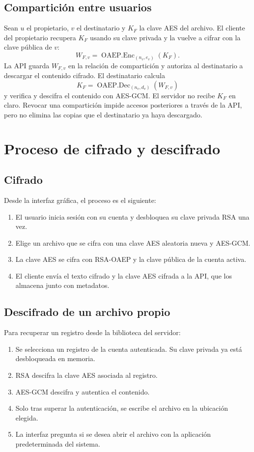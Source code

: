\documentclass[12pt,a4paper]{article}
\begin{document}
\subsection{Compartición entre usuarios}

Sean $u$ el propietario, $v$ el destinatario y $K_F$ la clave AES del archivo. El cliente del propietario recupera $K_F$ usando su clave privada y la vuelve a cifrar con la clave pública de $v$:
\[
W_{F,v}=\operatorname{OAEP.Enc}_{(n_v,e_v)}(K_F).
\]
La API guarda $W_{F,v}$ en la relación de compartición y autoriza al destinatario a descargar el contenido cifrado. El destinatario calcula
\[
K_F=\operatorname{OAEP.Dec}_{(n_v,d_v)}(W_{F,v})
\]
y verifica y descifra el contenido con AES-GCM. El servidor no recibe $K_F$ en claro. Revocar una compartición impide accesos posteriores a través de la API, pero no elimina las copias que el destinatario ya haya descargado.

\section{Proceso de cifrado y descifrado}

\subsection{Cifrado}

Desde la interfaz gráfica, el proceso es el siguiente:

\begin{enumerate}
    \item El usuario inicia sesión con su cuenta y desbloquea su clave privada RSA una vez.
    \item Elige un archivo que se cifra con una clave AES aleatoria nueva y AES-GCM.
    \item La clave AES se cifra con RSA-OAEP y la clave pública de la cuenta activa.
    \item El cliente envía el texto cifrado y la clave AES cifrada a la API, que los almacena junto con metadatos.
\end{enumerate}

\subsection{Descifrado de un archivo propio}

Para recuperar un registro desde la biblioteca del servidor:

\begin{enumerate}
    \item Se selecciona un registro de la cuenta autenticada. Su clave privada ya está desbloqueada en memoria.
    \item RSA descifra la clave AES asociada al registro.
    \item AES-GCM descifra y autentica el contenido.
    \item Solo tras superar la autenticación, se escribe el archivo en la ubicación elegida.
    \item La interfaz pregunta si se desea abrir el archivo con la aplicación predeterminada del sistema.
\end{enumerate}
\end{document}
